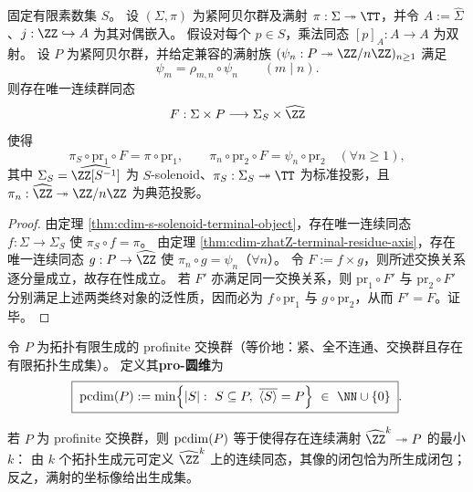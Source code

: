 

\begin{theorem}\label{thm:cdim-solenoid-residue-double-terminal-synthesis}
固定有限素数集 \(S\)。
设 \((\Sigma,\pi)\) 为紧阿贝尔群及满射 \(\pi:\Sigma\twoheadrightarrow\TT\)，并令 \(A:=\widehat{\Sigma}\)、\(j:\ZZ\hookrightarrow A\) 为其对偶嵌入。
假设对每个 \(p\in S\)，乘法同态 \([p]_A:A\to A\) 为双射。
设 \(P\) 为紧阿贝尔群，并给定兼容的满射族 \((\psi_n:P\twoheadrightarrow \ZZ/n\ZZ)_{n\ge 1}\) 满足
\[
\psi_m=\rho_{m,n}\circ\psi_n\qquad(m\mid n).
\]
则存在唯一连续群同态
\[
F:\Sigma\times P\longrightarrow \Sigma_S\times \widehat{\ZZ}
\]
使得
\[
\pi_S\circ \mathrm{pr}_1\circ F=\pi\circ \mathrm{pr}_1,
\qquad
\pi_n\circ \mathrm{pr}_2\circ F=\psi_n\circ \mathrm{pr}_2\quad(\forall n\ge 1),
\]
其中 \(\Sigma_S=\widehat{\ZZ[S^{-1}]}\) 为 \(S\)-solenoid、\(\pi_S:\Sigma_S\twoheadrightarrow\TT\) 为标准投影，且 \(\pi_n:\widehat{\ZZ}\twoheadrightarrow\ZZ/n\ZZ\) 为典范投影。
\end{theorem}
\begin{proof}
由定理 \ref{thm:cdim-s-solenoid-terminal-object}，存在唯一连续同态 \(f:\Sigma\to\Sigma_S\) 使 \(\pi_S\circ f=\pi\)。
由定理 \ref{thm:cdim-zhatZ-terminal-residue-axis}，存在唯一连续同态 \(g:P\to\widehat{\ZZ}\) 使 \(\pi_n\circ g=\psi_n\)（\(\forall n\)）。
令 \(F:=f\times g\)，则所述交换关系逐分量成立，故存在性成立。
若 \(F'\) 亦满足同一交换关系，则 \(\mathrm{pr}_1\circ F'\) 与 \(\mathrm{pr}_2\circ F'\) 分别满足上述两类终对象的泛性质，因而必为 \(f\circ\mathrm{pr}_1\) 与 \(g\circ\mathrm{pr}_2\)，从而 \(F'=F\)。证毕。
\end{proof}

\begin{definition}[pro-圆维]\label{def:cdim-pro-circle-dimension}
令 \(P\) 为拓扑有限生成的 profinite 交换群（等价地：紧、全不连通、交换群且存在有限拓扑生成集）。
定义其\textbf{pro-圆维}为
\[
\boxed{\;
\pcdim(P):=\min\Bigl\{|S|:\ S\subseteq P,\ \overline{\langle S\rangle}=P\Bigr\}\ \in\ \NN\cup\{0\}\; }.
\]
\end{definition}

\begin{remark}\label{rem:cdim-pro-cdim-zhat-surjection}
若 \(P\) 为 profinite 交换群，则 \(\operatorname{pcdim}(P)\) 等于使得存在连续满射 \(\widehat{\ZZ}^{k}\twoheadrightarrow P\) 的最小 \(k\)：
由 \(k\) 个拓扑生成元可定义 \(\widehat{\ZZ}^{k}\) 上的连续同态，其像的闭包恰为所生成闭包；反之，满射的坐标像给出生成集。
\end{remark}

